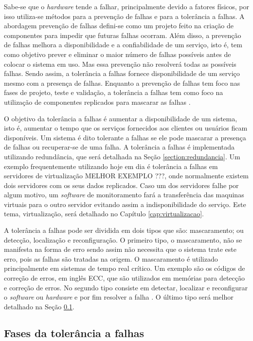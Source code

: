 Sabe-se que o \textit{hardware} tende a falhar, principalmente devido a fatores físicos, por isso utiliza-se métodos para a prevenção 
de falhas e para a tolerância a falhas. A abordagem prevenção de falhas defini-se como um projeto feito na criação de componentes para
impedir que futuras falhas ocorram. Além disso, a prevenção de falhas melhora a disponibilidade e a confiabilidade de um serviço, isto é, 
tem como objetivo prever e eliminar o maior número de falhas possíveis antes de colocar o sistema em uso. Mas essa prevenção não resolverá 
todas as possíveis falhas. Sendo assim, a tolerância a falhas fornece disponibilidade de um serviço mesmo com a presença de falhas. 
Enquanto a prevenção de falhas tem foco nas fases de projeto, teste e validação, a tolerância a falhas tem como foco na utilização de 
componentes replicados para mascarar as falhas \cite{pankaj1994}.

O objetivo da tolerância a falhas é aumentar a disponibilidade de um sistema, isto é, aumentar o tempo que os serviços fornecidos aos 
clientes ou usuários ficam disponíveis. Um sistema é dito tolerante a falhas se ele pode mascarar a presença de falhas ou recuperar-se 
de uma falha. A tolerância a falhas é implementada utilizando redundância, que será detalhada na Seção \ref{section:redundancia}. 
Um exemplo frequentemente utilizando hoje em dia é tolerância a falhas em servidores de virtualização MELHOR EXEMPLO ???, onde normalmente
existem dois servidores com os seus dados replicados. Caso um dos servidores falhe por algum motivo, um \textit{software} de monitoramento
fará a transferência das maquinas virtuais para o outro servidor evitando assim a indisponibilidade do serviço. Este tema, virtualização, 
será detalhado no Capítulo \ref{cap:virtualizacao}.

A tolerância a falhas pode ser dividida em dois tipos que são: mascaramento; ou detecção, localização e reconfiguração.
O primeiro tipo, o mascaramento, não se manifesta na forma de erro sendo assim não necessita que o sistema trate este erro,
pois as falhas são tratadas na origem. O mascaramento é utilizado principalmente em sistemas de tempo real crítico. 
Um exemplo são os códigos de correção de erros, em inglês \ac{ECC}, que são utilizados em memórias para detecção e correção de erros.
No segundo tipo consiste em detectar, localizar e reconfigurar o \textit{software} ou \textit{hardware} e por fim resolver a 
falha \cite{weber2002}. O último tipo será melhor detalhado na Seção \ref{section:fasestolerancia}.

\subsection{Fases da tolerância a falhas}
\label{section:fasestolerancia}

